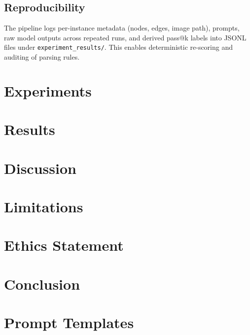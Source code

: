 \documentclass[11pt]{article}
\begin{document}
\subsection{Reproducibility}
\label{sec:repro}
The pipeline logs per-instance metadata (nodes, edges, image path), prompts, raw model outputs across repeated runs, and derived pass@k labels into JSONL files under \texttt{experiment\_results/}.
This enables deterministic re-scoring and auditing of parsing rules.

\section{Experiments}
\label{sec:experiments}

\section{Results}
\label{sec:results}

\section{Discussion}
\label{sec:discussion}

\section{Limitations}
\label{sec:limitations}

\section{Ethics Statement}
\label{sec:ethics}

\section{Conclusion}
\label{sec:conclusion}

% 
% 

\appendix
\section{Prompt Templates}
\label{sec:appendix-prompts}
\end{document}
